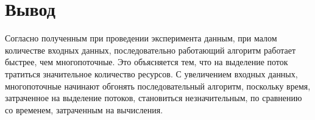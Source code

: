\section*{Вывод}

Согласно полученным при проведении эксперимента данным, при малом количестве входных данных, последовательно работающий алгоритм работает быстрее, чем многопоточные. 
Это объясняется тем, что на выделение поток тратиться значительное количество ресурсов.
С увеличением входных данных, многопоточные начинают обгонять последовательный алгоритм, поскольку время, затраченное на выделение потоков, становиться незначительным, по сравнению со временем, затраченным на вычисления.